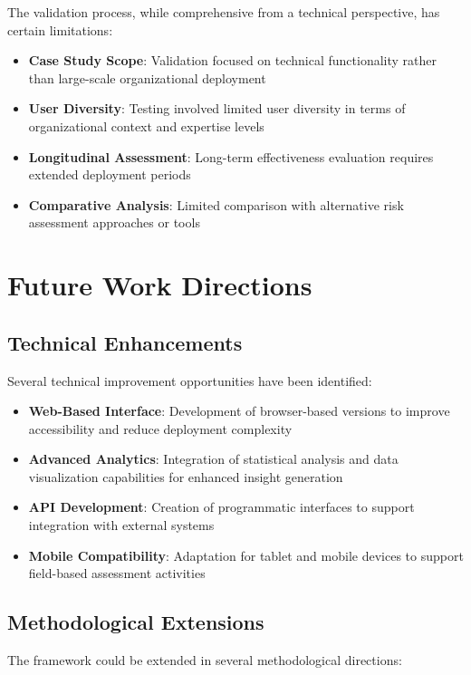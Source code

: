 \documentclass[binding=0.6cm]{sapthesis}
\begin{document}
The validation process, while comprehensive from a technical perspective, has certain limitations:

\begin{itemize}
    \item \textbf{Case Study Scope}: Validation focused on technical functionality rather than large-scale organizational deployment
    \item \textbf{User Diversity}: Testing involved limited user diversity in terms of organizational context and expertise levels
    \item \textbf{Longitudinal Assessment}: Long-term effectiveness evaluation requires extended deployment periods
    \item \textbf{Comparative Analysis}: Limited comparison with alternative risk assessment approaches or tools
\end{itemize}

\section{Future Work Directions}

\subsection{Technical Enhancements}

Several technical improvement opportunities have been identified:

\begin{itemize}
    \item \textbf{Web-Based Interface}: Development of browser-based versions to improve accessibility and reduce deployment complexity
    \item \textbf{Advanced Analytics}: Integration of statistical analysis and data visualization capabilities for enhanced insight generation
    \item \textbf{API Development}: Creation of programmatic interfaces to support integration with external systems
    \item \textbf{Mobile Compatibility}: Adaptation for tablet and mobile devices to support field-based assessment activities
\end{itemize}

\subsection{Methodological Extensions}

The framework could be extended in several methodological directions:
\end{document}
